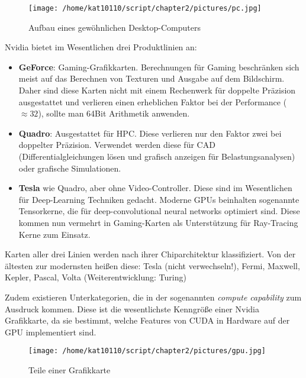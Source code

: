 		\begin{figure}[h]
			\centering
    		\texttt{[image: /home/kat10110/script/chapter2/pictures/pc.jpg]}
    		\caption[Desktop PC]{Aufbau eines gew\"ohnlichen Desktop-Computers}
    		\label{2:gpucpu}
		\end{figure}
		
		Nvidia bietet im Wesentlichen drei Produktlinien an:
		\begin{itemize}
		\item \textbf{GeForce}: Gaming-Grafikkarten. Berechnungen für Gaming beschränken sich meist auf das Berechnen von Texturen und Ausgabe auf dem Bildschirm. Daher sind diese Karten nicht mit einem Rechenwerk für doppelte Präzision ausgestattet und verlieren einen erheblichen Faktor bei der Performance ($\approx 32$), sollte man 64Bit Arithmetik anwenden.
		
		\item \textbf{Quadro}: Ausgestattet für HPC. Diese verlieren nur den Faktor zwei bei doppelter Präzision. Verwendet werden diese für CAD (Differentialgleichungen lösen und grafisch anzeigen für Belastungsanalysen) oder grafische Simulationen.
		
		\item \textbf{Tesla} wie Quadro, aber ohne Video-Controller. Diese sind im Wesentlichen für Deep-Learning Techniken gedacht. Moderne GPUs beinhalten sogenannte Tensorkerne, die für deep-convolutional neural networks optimiert sind. Diese kommen nun vermehrt in Gaming-Karten als Unterstützung für Ray-Tracing Kerne zum Einsatz.
		\end{itemize}		 		
		
        Karten aller drei Linien werden nach ihrer Chiparchitektur klassifiziert. Von der ältesten zur modernsten heißen diese: Tesla (nicht verwechseln!), Fermi, Maxwell, Kepler, Pascal, Volta (Weiterentwicklung: Turing)
        
        Zudem existieren Unterkategorien, die in der sogenannten \textit{\gls{compute capability}} zum Ausdruck kommen. Diese ist die wesentlichste Kenngröße einer Nvidia Grafikkarte, da sie bestimmt, welche Features von CUDA in Hardware auf der GPU implementiert sind.		
		
        \begin{figure}[h]
			\centering
    		\texttt{[image: /home/kat10110/script/chapter2/pictures/gpu.jpg]}
    		\caption[Grafikkarte]{Teile einer Grafikkarte}
    		\label{2:graka}
		\end{figure}
		
